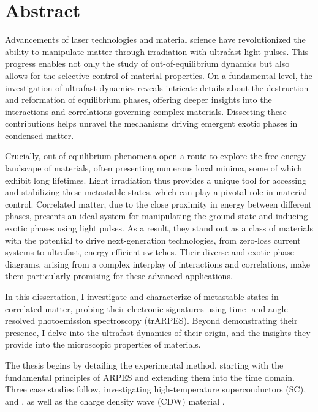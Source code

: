 

\cleardoublepage
\chapter*{Abstract}
Advancements of laser technologies and material science have revolutionized the ability to manipulate matter through irradiation with ultrafast light pulses.
This progress enables not only the study of out-of-equilibrium dynamics but also allows for the selective control of material properties.
On a fundamental level, the investigation of ultrafast dynamics reveals intricate details about the destruction and reformation of equilibrium phases, offering deeper insights into the interactions and correlations governing complex materials.
Dissecting these contributions helps unravel the mechanisms driving emergent exotic phases in condensed matter.

Crucially, out-of-equilibrium phenomena open a route to explore the free energy landscape of materials, often presenting numerous local minima, some of which exhibit long lifetimes.
Light irradiation thus provides a unique tool for accessing and stabilizing these metastable states, which can play a pivotal role in material control.
Correlated matter, due to the close proximity in energy between different phases, presents an ideal system for manipulating the ground state and inducing exotic phases using light pulses.
As a result, they stand out as a class of materials with the potential to drive next-generation technologies, from zero-loss current systems to ultrafast, energy-efficient switches.
Their diverse and exotic phase diagrams, arising from a complex interplay of interactions and correlations, make them particularly promising for these advanced applications.\hfill\break

In this dissertation, I investigate and characterize of metastable states in correlated matter, probing their electronic signatures using time- and angle-resolved photoemission spectroscopy (trARPES).
Beyond demonstrating their presence, I delve into the ultrafast dynamics of their origin, and the insights they provide into the microscopic properties of materials.\hfill\break

The thesis begins by detailing the experimental method, starting with the fundamental principles of ARPES and extending them into the time domain.
Three case studies follow, investigating high-temperature superconductors (SC),  and , as well as the charge density wave (CDW) material .

